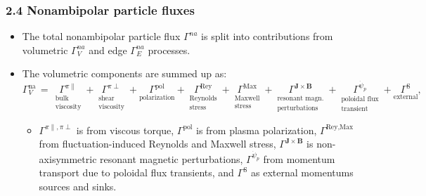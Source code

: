 \documentclass[]{article}
\begin{document}
\subsubsection{2.4 Nonambipolar particle
fluxes}\label{nonambipolar-particle-fluxes}

\begin{itemize}
\item
  The total nonambipolar particle flux \(\Gamma^{na}\) is split into
  contributions from volumetric \(\Gamma_V^{na}\) and edge
  \(\Gamma_E^{na}\) processes.
\item
  The volumetric components are summed up as:
  \[\Gamma_V^\text{na} \,=\, \underset{\substack{\text{bulk} \\ \text{viscosity}}}{\Gamma^{\pi \parallel}} + \underset{\substack{\text{shear} \\ \text{viscosity}}}{\Gamma^{\pi \perp}} + \underset{\text{polarization}}{\Gamma^\text{pol}} + \underset{\substack{\text{Reynolds} \\ \text{stress}}}{\Gamma^\text{Rey}} + \underset{\substack{\text{Maxwell} \\ \text{stress}}}{\Gamma^\text{Max}} + \underset{\substack{\text{resonant magn.} \\ \text{perturbations}}}{\Gamma^{\mathbf{J}\times\mathbf{B}}} + \underset{\substack{\text{poloidal flux} \\ \text{transient}}}{\Gamma^{\dot{\psi}_p}} + \underset{\text{external}}{\Gamma^\text{S}},\]

  \begin{itemize}
  \item
    \(\Gamma^{\pi\parallel, \pi \perp}\) is from viscous torque,
    \(\Gamma^\text{pol}\) is from plasma polarization,
    \(\Gamma^\text{Rey,Max}\) from fluctuation-induced Reynolds and
    Maxwell stress, \(\Gamma^{\mathbf{J}\times\mathbf{B}}\) is
    non-axisymmetric resonant magnetic perturbations,
    \(\Gamma^{\dot{\psi}_p}\) from momentum transport due to poloidal
    flux transients, and \(\Gamma^\text{S}\) as external momentums
    sources and sinks.


\end{itemize}
\end{itemize}
\end{document}
